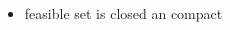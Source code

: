 \documentclass[8pt,a4paper]{scrartcl}
\begin{document}
\begin{multicols*}{3}
\begin{itemize}

\item feasible set is closed an compact
\end{itemize}

%
%
%
%
%
%
%
%
%
%
%
%
%
%

\end{multicols*}
\end{document}

